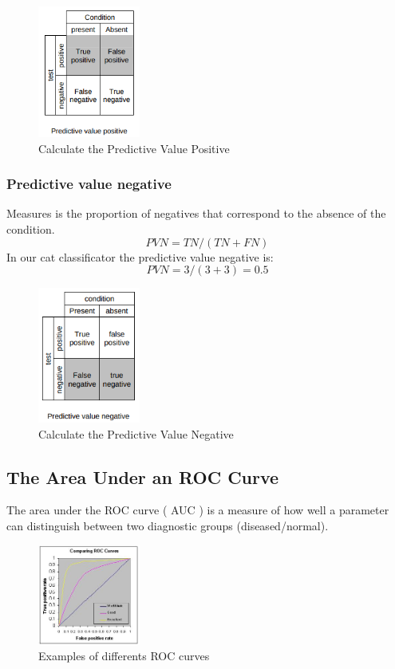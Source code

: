 \begin{figure}[H]
\centering
\includegraphics[width=0.3\textwidth]{./figures/PredictiveValuePositive}
\caption{Calculate the Predictive Value Positive}
\end{figure}


\subsubsection[Predictive value negative]{Predictive value negative}
Measures is the proportion of negatives that correspond to the absence of the condition. 
\[ PVN =  TN/(TN+FN) \]
In our cat classificator the predictive value negative is:
\[ PVN = 3/(3+3) = 0.5 \]

\begin{figure}[H]
\centering
\includegraphics[width=0.3\textwidth]{./figures/PredictiveValueNegative}
\caption{Calculate the Predictive Value Negative}
\end{figure}

\subsection[The Area Under an ROC Curve]{The Area Under an ROC Curve}

The area under the ROC curve ( AUC ) is a measure of how well a parameter can distinguish between two diagnostic groups (diseased/normal). 

\begin{figure}[H]
\centering
\includegraphics[width=0.3\textwidth]{./figures/ROC}
\caption{Examples of differents ROC curves \cite{area-roc-curve}}
\end{figure}

